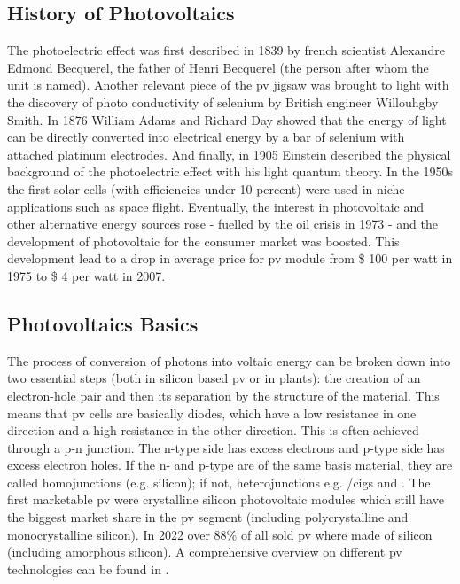 \subsection{History of Photovoltaics}
The photoelectric effect was first described in 1839 by french scientist Alexandre 
Edmond Becquerel\cite{becquerel1839memoire}, the father of Henri Becquerel (the person after whom the unit is named).
Another relevant piece of the \gls{pv} jigsaw was brought to light
with the discovery of photo conductivity of selenium
by British engineer Willouhgby Smith\cite{Smith1873Selenium}.
In 1876 William Adams and Richard Day\cite{Adams1876Selenium} showed that 
the energy of light can be directly converted into electrical energy by a bar of 
selenium with attached platinum electrodes.
And finally, in 1905 Einstein described the physical background of the photoelectric 
effect with his light quantum theory\cite{einstein1905erzeugung}.
In the 1950s the first solar cells (with efficiencies under 10 percent) were used in niche applications such as space flight. 
Eventually, the interest in photovoltaic and other alternative energy sources 
rose - fuelled by the oil crisis in 1973 - 
and the development of photovoltaic for the consumer market was boosted. 
This development lead to a drop in 
average price for \gls{pv} module from \$ 100 per watt in 1975 to \$ 4 per watt in 2007\cite{pagliaro2008flexible}.

\subsection{Photovoltaics Basics}
The process of conversion of photons into voltaic energy can be broken down into two essential steps (both in silicon based \gls{pv} or in plants): 
the creation of an electron-hole pair and then its separation by the structure of the material.\cite{markvart2013principles}
This means that \gls{pv} cells are basically diodes, which have a low resistance in one direction and a high resistance in the other direction. 
This is often achieved through a p-n junction.
The n-type side has excess electrons and p-type side has excess electron holes. 
If the n- and p-type are of the same basis material, they are called homojunctions (e.g. silicon); if not, heterojunctions e.g. /\gls{cigs} and .\cite{breitenstein2013understanding}
%
The first marketable \gls{pv} were crystalline silicon photovoltaic modules which still 
have the biggest market share in the \gls{pv} segment (including polycrystalline and monocrystalline silicon).
In 2022 
over 88\% of all sold \gls{pv} where made of silicon (including amorphous silicon).\cite{breitenstein2013understanding}
%
A comprehensive overview on different \gls{pv} technologies can be found in \cite{markvart2013principles}.



